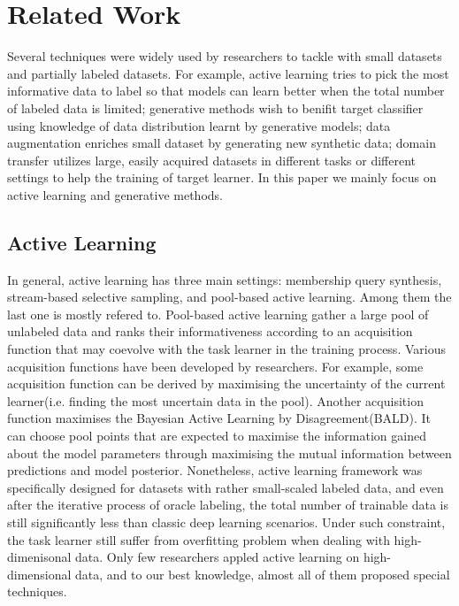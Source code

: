 \documentclass[letterpaper]{article}
\begin{document}
\section{Related Work}
Several techniques were widely used by researchers to tackle with small datasets and partially labeled datasets. For example, active learning\cite{settles2009active} tries to pick the most informative data to label so that models can learn better when the total number of labeled data is limited; generative methods\cite{kingma2014semi}\cite{springenberg2015unsupervised} wish to benifit target classifier using knowledge of data distribution learnt by generative models; data augmentation\cite{tanner1987calculation} enriches small dataset by generating new synthetic data; domain transfer\cite{pan2009survey} utilizes large, easily acquired datasets in different tasks or different settings to help the training of target learner. In this paper we mainly focus on active learning and generative methods.
\subsection{Active Learning}
In general, active learning has three main settings: membership query synthesis, stream-based selective sampling, and
pool-based active learning\cite{pan2009survey}. Among them the last one is mostly refered to. Pool-based active learning gather a large pool of unlabeled data and ranks their informativeness according to an acquisition function that may coevolve with the task learner in the training process. Various acquisition functions have been developed by researchers. For example, some acquisition function can be derived by maximising the uncertainty of the current learner(i.e. finding the most uncertain data in the pool). Another acquisition function maximises the Bayesian Active Learning by Disagreement(BALD)\cite{houlsby2011bayesian}. It can choose pool points that are expected to maximise the information gained about the model parameters through maximising the mutual information between predictions and model posterior. Nonetheless, active learning framework was specifically designed for datasets with rather small-scaled labeled data, and even after the iterative process of oracle labeling, the total number of trainable data is still significantly less than classic deep learning scenarios. Under such constraint, the task learner still suffer from overfitting problem when dealing with high-dimenisonal data. Only few researchers appled active learning on high-dimensional data, and to our best knowledge, almost all of them proposed special techniques\cite{Gal:2017:DBA:3305381.3305504}.
\end{document}
